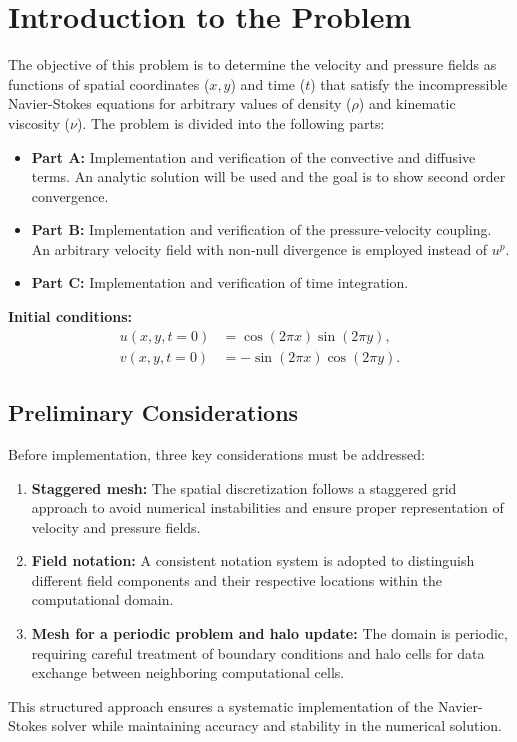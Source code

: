 \section{Introduction to the Problem}

The objective of this problem is to determine the velocity and pressure fields as functions of spatial coordinates ($x, y$) and time ($t$) that satisfy the incompressible Navier-Stokes equations for arbitrary values of density ($\rho$) and kinematic viscosity ($\nu$). The problem is divided into the following parts:
\begin{itemize}
    \item \textbf{Part A:} Implementation and verification of the convective and diffusive terms. An analytic solution will be used and the goal is to show second order convergence.
    
    \item \textbf{Part B:} Implementation and verification of the pressure-velocity coupling. An arbitrary velocity field with non-null divergence is employed instead of $u^p$.
    
    \item \textbf{Part C:} Implementation and verification of time integration.
\end{itemize}
  
\textbf{Initial conditions:}
\begin{align*}
    u(x, y, t=0) &= \cos(2\pi x) \sin(2\pi y), \\
    v(x, y, t=0) &= -\sin(2\pi x) \cos(2\pi y).
\end{align*}

\subsection{Preliminary Considerations}
Before implementation, three key considerations must be addressed:
\begin{enumerate}
    \item \textbf{Staggered mesh:} The spatial discretization follows a staggered grid approach to avoid numerical instabilities and ensure proper representation of velocity and pressure fields.
    \item \textbf{Field notation:} A consistent notation system is adopted to distinguish different field components and their respective locations within the computational domain.
    \item \textbf{Mesh for a periodic problem and halo update:} The domain is periodic, requiring careful treatment of boundary conditions and halo cells for data exchange between neighboring computational cells.
\end{enumerate}

This structured approach ensures a systematic implementation of the Navier-Stokes solver while maintaining accuracy and stability in the numerical solution.

